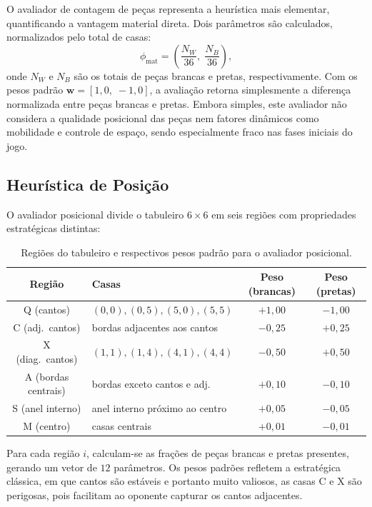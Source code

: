 \documentclass[12pt]{article}
\begin{document}
O avaliador de contagem de peças representa a heurística mais elementar,
quantificando a vantagem material direta. Dois parâmetros são calculados, normalizados pelo
total de casas:
\begin{equation}
  \phi_{\text{mat}} = \left(\frac{N_W}{36},\; \frac{N_B}{36}\right),
\end{equation}
onde $N_W$ e $N_B$ são os totais de peças brancas e pretas, respectivamente. Com os pesos
padrão $\mathbf{w} = [1{,}0,\; {-}1{,}0]$, a avaliação retorna simplesmente a diferença
normalizada entre peças brancas e pretas. Embora simples, este avaliador não considera a qualidade posicional das peças nem fatores dinâmicos como
mobilidade e controle de espaço, sendo especialmente fraco nas fases iniciais do jogo.
 
\subsection{Heurística de Posição}
 
O avaliador posicional divide o tabuleiro $6\!\times\!6$ em seis
regiões com propriedades estratégicas distintas:
 
\begin{table}[H]
  \centering
  \caption{Regiões do tabuleiro e respectivos pesos padrão para o avaliador posicional.}
  \label{tab:regions}
  \begin{tabular}{clcc}
    \toprule
    Região & Casas & Peso (brancas) & Peso (pretas) \\
    \midrule
    Q (cantos) & $(0,0),(0,5),(5,0),(5,5)$ & $+1{,}00$ & $-1{,}00$ \\
    C (adj.\ cantos) & bordas adjacentes aos cantos & $-0{,}25$ & $+0{,}25$ \\
    X (diag.\ cantos) & $(1,1),(1,4),(4,1),(4,4)$ & $-0{,}50$ & $+0{,}50$ \\
    A (bordas centrais) & bordas exceto cantos e adj. & $+0{,}10$ & $-0{,}10$ \\
    S (anel interno) & anel interno próximo ao centro & $+0{,}05$ & $-0{,}05$ \\
    M (centro) & casas centrais & $+0{,}01$ & $-0{,}01$ \\
    \bottomrule
  \end{tabular}
\end{table}
 
Para cada região $i$, calculam-se as frações de peças brancas e pretas presentes, gerando
um vetor de $12$ parâmetros. Os pesos padrões refletem a estratégica clássica, em que cantos são
estáveis e portanto muito valiosos, as casas C e X são perigosas, pois facilitam ao oponente
capturar os cantos adjacentes.
 
\end{document}
